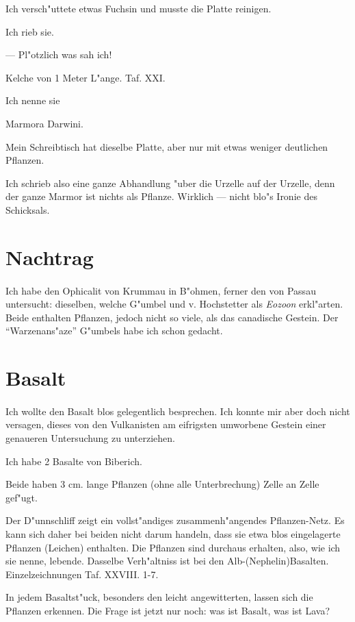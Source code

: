 \documentclass[a4paper, 11pt, oneside, german]{article}
\begin{document}
Ich versch"uttete etwas Fuchsin und musste die Platte reinigen.

Ich rieb sie.

--- Pl"otzlich was sah ich!

Kelche von 1 Meter L"ange. Taf. XXI.

Ich nenne sie

Marmora Darwini.

Mein Schreibtisch hat dieselbe Platte, aber nur mit etwas weniger deutlichen Pflanzen.

Ich schrieb also eine ganze Abhandlung "uber die Urzelle auf der Urzelle, denn der ganze Marmor ist nichts als Pflanze. Wirklich --- nicht blo"s Ironie des Schicksals.
\clearpage
\section{Nachtrag}
\paragraph{}
Ich habe den Ophicalit von Krummau in B"ohmen, ferner den von Passau untersucht: dieselben, welche G"umbel und v. Hochstetter als \emph{Eozoon} erkl"arten. Beide enthalten Pflanzen, jedoch nicht so viele, als das canadische Gestein. Der "`Warzenans"aze"' G"umbels habe ich schon gedacht.
\clearpage
\section{Basalt}
\paragraph{}
Ich wollte den Basalt blos gelegentlich besprechen. Ich konnte mir aber doch nicht versagen, dieses von den Vulkanisten am eifrigsten umworbene Gestein einer genaueren Untersuchung zu unterziehen.

Ich habe 2 Basalte von Biberich.

Beide haben 3 cm. lange Pflanzen (ohne alle Unterbrechung) Zelle an Zelle gef"ugt.

Der D"unnschliff zeigt ein vollst"andiges zusammenh"angendes Pflanzen-Netz. Es kann sich daher bei beiden nicht darum handeln, dass sie etwa blos eingelagerte Pflanzen (Leichen) enthalten. Die Pflanzen sind durchaus erhalten, also, wie ich sie nenne, lebende. Dasselbe Verh"altniss ist bei den Alb-(Nephelin)Basalten. Einzelzeichnungen Taf. XXVIII. 1-7.

In jedem Basaltst"uck, besonders den leicht angewitterten, lassen sich die Pflanzen erkennen. Die Frage ist jetzt nur noch: was ist Basalt, was ist Lava?
\end{document}
